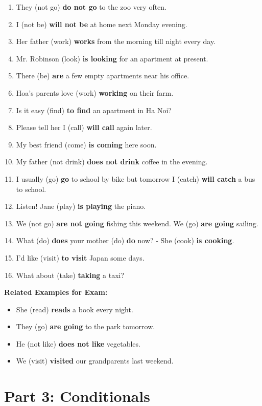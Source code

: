 \documentclass{article}
\begin{document}
\begin{enumerate}
    \item They (not go) \textbf{do not go} to the zoo very often.
    \item I (not be) \textbf{will not be} at home next Monday evening.
    \item Her father (work) \textbf{works} from the morning till night every day.
    \item Mr. Robinson (look) \textbf{is looking} for an apartment at present.
    \item There (be) \textbf{are} a few empty apartments near his office.
    \item Hoa's parents love (work) \textbf{working} on their farm.
    \item Is it easy (find) \textbf{to find} an apartment in Ha Noi?
    \item Please tell her I (call) \textbf{will call} again later.
    \item My best friend (come) \textbf{is coming} here soon.
    \item My father (not drink) \textbf{does not drink} coffee in the evening.
    \item I usually (go) \textbf{go} to school by bike but tomorrow I (catch) \textbf{will catch} a bus to school.
    \item Listen! Jane (play) \textbf{is playing} the piano.
    \item We (not go) \textbf{are not going} fishing this weekend. We (go) \textbf{are going} sailing.
    \item What (do) \textbf{does} your mother (do) \textbf{do} now? - She (cook) \textbf{is cooking}.
    \item I'd like (visit) \textbf{to visit} Japan some days.
    \item What about (take) \textbf{taking} a taxi?
\end{enumerate}

\textbf{Related Examples for Exam:}
\begin{itemize}
    \item She (read) \textbf{reads} a book every night.
    \item They (go) \textbf{are going} to the park tomorrow.
    \item He (not like) \textbf{does not like} vegetables.
    \item We (visit) \textbf{visited} our grandparents last weekend.
\end{itemize}

\section*{Part 3: Conditionals}
\end{document}
